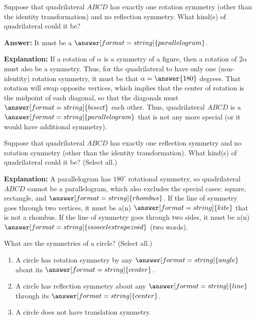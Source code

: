 \documentclass[nooutcomes]{ximera}
\begin{document}
\begin{question}
Suppose that quadrilateral $ABCD$ has exactly one rotation symmetry (other than the identity transformation) and no reflection symmetry.  What kind(s) of quadrilateral could it be?  

\textbf{Answer:}  It must be a $\answer[format=string]{parallelogram}$.
\begin{question}
\textbf{Explanation:} If a rotation of $\alpha$ is a symmetry of a figure, then a rotation of $2\alpha$ must also be a symmetry.  Thus, for the quadrilateral to have only one (non-identity) rotation symmetry, it must be that $\alpha = \answer{180}$ degrees.  That rotation will swap opposite vertices, which implies that the center of rotation is the midpoint of each diagonal, so that the diagonals must $\answer[format=string]{bisect}$ each other.  Thus, quadrilateral $ABCD$ is a $\answer[format=string]{parallelogram}$ that is not any more special (or it would have additional symmetry).  
\end{question}
\end{question}

\begin{question}
Suppose that quadrilateral $ABCD$ has exactly one reflection symmetry and no rotation symmetry (other than the identity transformation).  What kind(s) of quadrilateral could it be? (Select all.)
\begin{selectAll} 
\end{selectAll}
\begin{question}
\textbf{Explanation:}  A parallelogram has $180^\circ$ rotational symmetry, so quadrilateral $ABCD$ cannot be a parallelogram, which also excludes the special cases: square, rectangle, 
and $\answer[format=string]{rhombus}$.  If the line of symmetry goes through two vertices, it must be a(n) $\answer[format=string]{kite}$ that is not a rhombus.  If the line of symmetry goes through two sides, it must be a(n) $\answer[format=string]{isosceles trapezoid}$ (two words).  
\end{question}
\end{question}

\begin{question}
What are the symmetries of a circle? (Select all.)
\begin{selectAll}
\end{selectAll}
\begin{question}
\begin{enumerate}
\item A circle has rotation symmetry by any $\answer[format=string]{angle}$ 
about its $\answer[format=string]{center}$.  
\item A circle has reflection symmetry 
about any $\answer[format=string]{line}$ through its $\answer[format=string]{center}$.  
\item A circle does 
not have translation symmetry.  
\end{enumerate}
\end{question}
\end{question}
\end{document}
